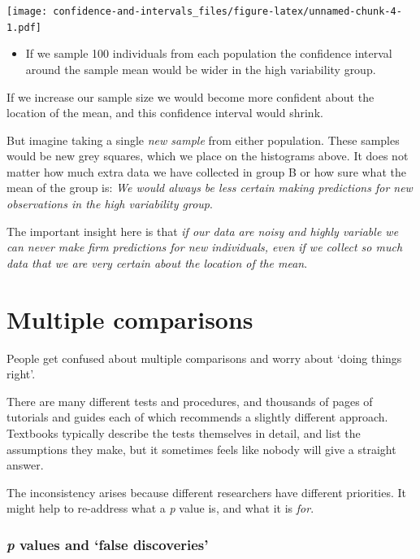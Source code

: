 \documentclass[]{article}
\providecommand{\tightlist}{%
  \setlength{\itemsep}{0pt}\setlength{\parskip}{0pt}}
\begin{document}
\texttt{[image: confidence-and-intervals\_files/figure-latex/unnamed-chunk-4-1.pdf]}

\begin{itemize}
\tightlist
\item
  If we sample 100 individuals from each population the confidence interval
  around the sample mean would be wider in the high variability group.
\end{itemize}

If we increase our sample size we would become more confident about the location
of the mean, and this confidence interval would shrink.

But imagine taking a single \emph{new sample} from either population. These samples
would be new grey squares, which we place on the histograms above. It does not
matter how much extra data we have collected in group B or how sure what the
mean of the group is: \emph{We would always be less certain making predictions for
new observations in the high variability group}.

The important insight here is that \emph{if our data are noisy and highly variable we
can never make firm predictions for new individuals, even if we collect so much
data that we are very certain about the location of the mean}.

\hypertarget{multiple-comparisons}{%
\section{Multiple comparisons}\label{multiple-comparisons}}

People get confused about multiple comparisons and worry about `doing things
right'.

There are many different tests and procedures, and thousands of pages of
tutorials and guides each of which recommends a slightly different approach.
Textbooks typically describe the tests themselves in detail, and list the
assumptions they make, but it sometimes feels like nobody will give a straight
answer.

The inconsistency arises because different researchers have different
priorities. It might help to re-address what a \emph{p} value is, and what it is
\emph{for}.

\hypertarget{p-values-and-false-discoveries}{%
\subsubsection*{\texorpdfstring{\emph{p} values and `false discoveries'}{p values and `false discoveries'}}\label{p-values-and-false-discoveries}}
\end{document}
